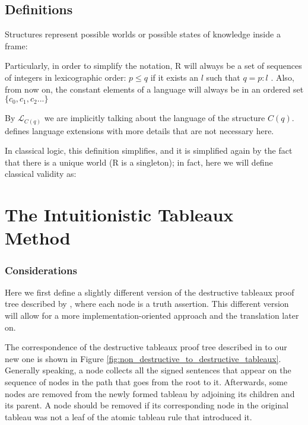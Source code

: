 \documentclass[runningheads]{llncs}
\begin{document}
\subsection{Definitions}

\structureDefinition
Structures represent possible worlds or possible states of knowledge inside a frame:
\kripkeFrameDefinition

Particularly, in order to simplify the notation, R will always be a set of sequences of integers in lexicographic order: $p \leq q$ if it exists an $l$ such that $q =  p:l$  . 
 Also, from now on, the constant elements of a language will always be in an ordered set $\{c_0, c_1, c_2 ...\}$
 
 \figureRandFrame

\forcingDefinition

By $\mathcal{L}_{C(q)}$ we are implicitly talking about the language of the structure $C(q)$. \cite{book1} defines language extensions with more details that are not necessary here.

\intuitionisticValidityDefinition

In classical logic, this definition simplifies, and it is simplified again by the fact that there is a unique world (R is a singleton); in fact, here we will define classical validity as: \cite{book1}

\classicalValidityDefinition

\section{The Intuitionistic Tableaux Method}

\subsubsection{Considerations}


    Here we first define a slightly different version of the destructive tableaux proof tree described by \cite{book1}, where each node is a truth assertion. This different version  will allow for a more implementation-oriented approach and the translation later on.

    The correspondence of the destructive tableaux proof tree described in \cite{book1} to our new one is shown in Figure \ref{fig:non_destructive_to_destructive_tableaux}.
     Generally speaking, a node collects all the signed sentences that appear on the sequence of nodes in the path that goes from the root to it.
      Afterwards, some nodes are removed from the newly formed tableau by adjoining its children and its parent.
       A node should be removed if its corresponding node in the original tableau was not a leaf of the atomic tableau rule  \cite{book1} that introduced it.
\end{document}
